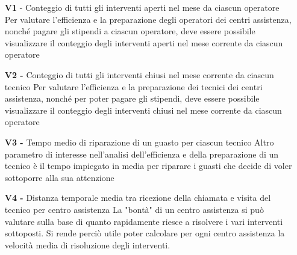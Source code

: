\documentclass[a4paper, 12pt]{report}
\begin{document}
\begin{itemize}
	\item[\textbf{V1} -] Conteggio di tutti gli interventi aperti nel mese da ciascun operatore
		\subitem Per valutare l'efficienza e la preparazione degli operatori dei centri assistenza, nonché pagare gli stipendi a ciascun operatore, deve essere
		possibile visualizzare il conteggio degli interventi aperti nel mese corrente da ciascun operatore
	\item[\textbf{V2 -}] Conteggio di tutti gli interventi chiusi nel mese corrente da ciascun tecnico
		\subitem Per valutare l'efficienza e la preparazione dei tecnici dei centri assistenza, nonché per poter pagare gli stipendi, deve essere
		possibile visualizzare il conteggio degli interventi chiusi nel mese corrente da ciascun operatore
	\item[\textbf{V3 -}] Tempo medio di riparazione di un guasto per ciascun tecnico
		\subitem Altro parametro di interesse nell'analisi dell'efficienza e della preparazione di un tecnico è il tempo impiegato in media per riparare i guasti
		che decide di voler sottoporre alla sua attenzione
	\item[\textbf{V4 -}] Distanza temporale media tra ricezione della chiamata e visita del tecnico per centro assistenza
		\subitem La "bontà" di un centro assistenza si può valutare sulla base di quanto rapidamente riesce a risolvere i vari interventi sottoposti. Si rende perciò
		utile poter calcolare per ogni centro assistenza la velocità media di risoluzione degli interventi.
\end{itemize}
\end{document}
